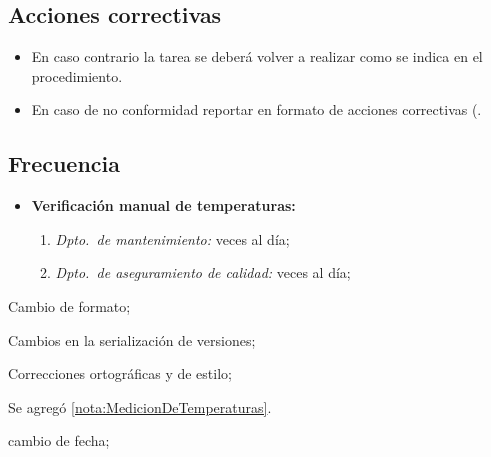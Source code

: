 \subsection{Acciones correctivas}

\begin{itemize}
	\item En caso contrario la tarea se deberá volver a realizar como se indica en el procedimiento.
	\item En caso de no conformidad reportar en formato de acciones correctivas (\RAC.
\end{itemize}

\subsection{Frecuencia}

\begin{itemize}
	\item \textbf{Verificación manual de temperaturas:}
		\begin{enumerate}
			\item \emph{Dpto.\ de mantenimiento:} \VecesTempManual veces al día;
			\item \emph{Dpto.\ de aseguramiento de calidad:} \VecesTempManual veces al día;
		\end{enumerate}
\end{itemize}

\begin{changelog}[title=Registro de cambios,simple, sectioncmd=\subsection*,label=changelog-\thesection-\MayorVer.\MenorVer]

	\begin{version}[v=2.1, date=2023--01, author=Pablo E. Alanis]
		\item Cambio de formato;
		\item Cambios en la serialización de versiones;
		\item Correcciones ortográficas y de estilo;
		\item Se agregó \cref{nota:MedicionDeTemperaturas}.
	\end{version}

	\begin{version}[v=1.8, date=2022--05, author=Alonso M.]
		\item cambio de fecha;
	\end{version}

\end{changelog}